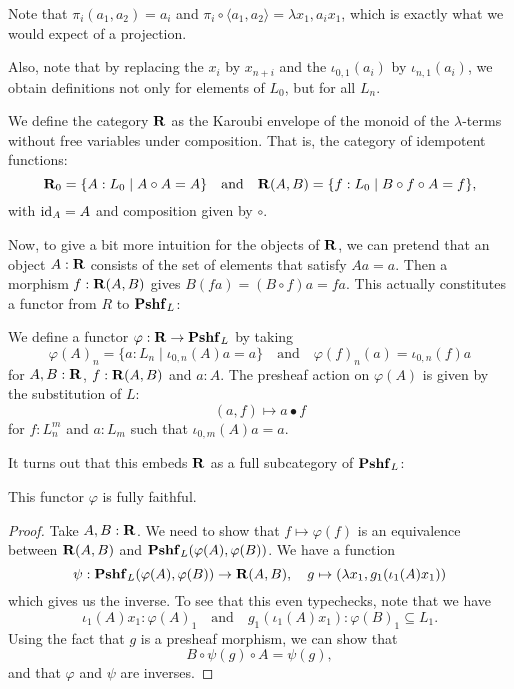 Note that $ \pi_i (a_1, a_2) = a_i $ and $ \pi_i \circ \langle a_1, a_2 \rangle = \lambda x_1, a_i x_1 $, which is exactly what we would expect of a projection.

Also, note that by replacing the $ x_i $ by $ x_{n + i} $ and the $ \iota_{0, 1}(a_i) $ by $ \iota_{n, 1}(a_i) $, we obtain definitions not only for elements of $ L_0 $, but for all $ L_n $.

\begin{definition}
  We define the category $ \mathbf{R} $ as the Karoubi envelope of the monoid of the $ \lambda $-terms without free variables under composition. That is, the category of idempotent functions:
  \[ \mathbf{R}_0 = \{ A : L_0 \mid A \circ A = A \} \quad \text{and} \quad \mathbf{R}(A, B) = \{ f: L_0 \mid B \circ f \circ A = f \}, \]
  with $ \text{id}_{A} = A $ and composition given by $ \circ $.
\end{definition}

Now, to give a bit more intuition for the objects of $ \mathbf{R} $, we can pretend that an object $ A : \mathbf{R} $ consists of the set of elements that satisfy $ A a = a $. Then a morphism $ f : \mathbf{R}(A, B) $ gives $ B (f a) = (B \circ f) a = f a $. This actually constitutes a functor from $ R $ to $ \mathbf{Pshf}_{L} $:

\begin{definition}\label{def:retracts-embedding}
  We define a functor $ \varphi: \mathbf{R} \to \mathbf{Pshf}_{L} $ by taking
  \[ \varphi(A)_n = \{ a : L_n \mid \iota_{0, n}(A) a = a \} \quad \text{and} \quad \varphi(f)_n(a) = \iota_{0, n}(f) a \]
  for $ A, B : \mathbf{R} $, $ f: \mathbf{R}(A, B) $ and $ a : A $. The presheaf action on $ \varphi(A) $ is given by the substitution of $ L $:
  \[ (a, f) \mapsto a \bullet f \]
  for $ f : L_n^m $ and $ a : L_m $ such that $ \iota_{0, m}(A) a = a $.
\end{definition}

It turns out that this embeds $ \mathbf{R} $ as a full subcategory of $ \mathbf{Pshf}_{L} $:
\begin{lemma}
  This functor $ \varphi $ is fully faithful.
\end{lemma}
\begin{proof}
  Take $ A, B : \mathbf{R} $. We need to show that $ f \mapsto \varphi(f) $ is an equivalence between $ \mathbf{R}(A, B) $ and $ \mathbf{Pshf}_{L}(\varphi(A), \varphi(B)) $. We have a function
  \[ \psi: \mathbf{Pshf}_{L}(\varphi(A), \varphi(B)) \to \mathbf{R}(A, B), \quad g \mapsto (\lambda x_1, g_1(\iota_1(A) x_1)) \]
  which gives us the inverse. To see that this even typechecks, note that we have
  \[ \iota_1(A) x_1 : \varphi(A)_1 \quad \text{and} \quad g_1(\iota_1(A) x_1) : \varphi(B)_1 \subseteq L_1. \]
  Using the fact that $ g $ is a presheaf morphism, we can show that
  \[ B \circ \psi(g) \circ A = \psi(g), \]
  and that $ \varphi $ and $ \psi $ are inverses.
\end{proof}

